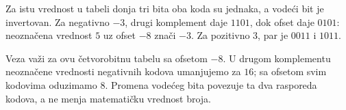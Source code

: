 
Za istu vrednost u tabeli donja tri bita oba koda su jednaka, a vodeći bit je invertovan. Za negativno $-3$, drugi komplement daje $1101$, dok ofset daje $0101$: neoznačena vrednost $5$ uz ofset $-8$ znači $-3$. Za pozitivno $3$, par je $0011$ i $1011$.

Veza važi za ovu četvorobitnu tabelu sa ofsetom $-8$. U drugom komplementu neoznačene vrednosti negativnih kodova umanjujemo za $16$; sa ofsetom svim kodovima oduzimamo $8$. Promena vodećeg bita povezuje ta dva rasporeda kodova, a ne menja matematičku vrednost broja.
